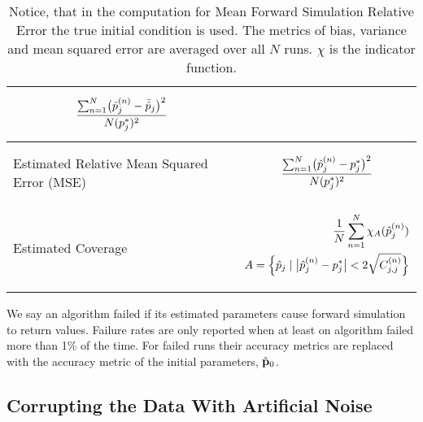 \begin{table}
\begin{tabular}{lr}
\begin{minipage}{7cm}
			\begin{equation} \label{eq:estimVar}
				\frac{\sum_{n=1}^N \bigl(\hat{p}_j^{(n)} - \bar{\hat{p}}_j\bigr)^2}{N(p^*_j)^2} \\[5pt]
			\end{equation}
		\end{minipage} \\
		\hline 
		\\[-5pt]
		Estimated Relative Mean Squared Error (MSE) & \begin{minipage}{7cm}
			\begin{equation} \label{eq:estimMSE}
				\frac{\sum_{n=1}^N \bigl(\hat{p}_j^{(n)} - p^*_j\bigr)^2}{N(p^*_j)^2} \\[5pt]
			\end{equation}
		\end{minipage} \\
		\hline 
		\\[-20pt]
		Estimated Coverage & \begin{minipage}{7.5cm}
            \begin{equation} \label{eq:estimCov}
                \begin{split}
					\frac{1}{N} \sum_{n=1}^N \chi_A(\hat{p}_j^{(n)}) \\
                    A = \Bigl\{\hat{p}_j \mid \bigl\lvert\hat{p}_j^{(n)} - p^*_j\bigr\rvert <  2 \sqrt{C_{j,j}^{(n)}}\Bigr\}\\[5pt]
                \end{split}
			\end{equation}
		\end{minipage} \\
		\bottomrule
	\end{tabular}
	\caption{Notice, that in the computation for Mean Forward Simulation Relative Error the true initial condition is used. The metrics of bias, variance and mean squared error are averaged over all $N$ runs. $\chi$ is the indicator function.
	}
	\label{table:metrics}
\end{table}

We say an algorithm failed if its estimated parameters cause forward simulation to return  values. Failure rates are only reported when at least on algorithm failed more than 1\% of the time. For failed runs their accuracy metrics are replaced with the accuracy metric of the initial parameters, $\hat{\mathbf{p}}_0$.

\subsection{Corrupting the Data With Artificial Noise} \label{sec:artificialNoise}

